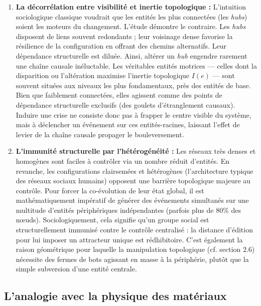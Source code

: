 \documentclass{report}
\begin{document}
	\begin{enumerate}
		\item \textbf{La décorrélation entre visibilité et inertie topologique :} L'intuition sociologique classique voudrait que les entités les plus connectées (les \textit{hubs}) soient les moteurs du changement. L'étude démontre le contraire. Les \textit{hubs} disposent de liens souvent redondants ; leur voisinage dense favorise la résilience de la configuration en offrant des chemins alternatifs. Leur dépendance structurelle est diluée. Ainsi, altérer un \textit{hub} engendre rarement une chaîne causale inéluctable. Les véritables entités motrices --- celles dont la disparition ou l'altération maximise l'inertie topologique $I(e)$ --- sont souvent situées aux niveaux les plus fondamentaux, près des entités de base. Bien que faiblement connectées, elles agissent comme des points de dépendance structurelle exclusifs (des goulets d'étranglement causaux). Induire une crise ne consiste donc pas à frapper le centre visible du système, mais à déclencher un événement sur ces entités-racines, laissant l'effet de levier de la chaîne causale propager le bouleversement.
		\item \textbf{L'immunité structurelle par l'hétérogénéité :} Les réseaux très denses et homogènes sont faciles à contrôler via un nombre réduit d'entités. En revanche, les configurations clairsemées et hétérogènes (l'architecture typique des réseaux sociaux humains) opposent une barrière topologique majeure au contrôle. Pour forcer la co-évolution de leur état global, il est mathématiquement impératif de générer des événements simultanés sur une multitude d'entités périphériques indépendantes (parfois plus de 80\% des nœuds). Sociologiquement, cela signifie qu'un groupe social est structurellement immunisé contre le contrôle centralisé : la distance d'édition pour lui imposer un attracteur unique est rédhibitoire. C'est également la raison géométrique pour laquelle la manipulation topologique (cf. section 2.6) nécessite des fermes de bots agissant en masse à la périphérie, plutôt que la simple subversion d'une entité centrale.
	\end{enumerate}
	
	\subsection*{L'analogie avec la physique des matériaux}
	
\end{document}
